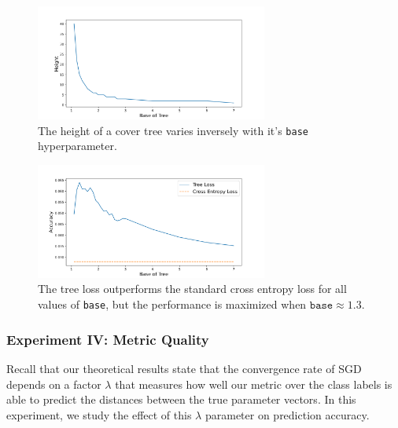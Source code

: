 \documentclass[twoside]{article}
\begin{document}
\begin{figure}
            \includegraphics[width=\columnwidth,height=1.5in]{fig/new_img/height_vs_base.png}
            \caption{The height of a cover tree varies inversely with it's \texttt{base} hyperparameter.}
            \label{fig:ct:height}
\end{figure}

\begin{figure}
    \includegraphics[width=\columnwidth,height=1.5in]{fig/new_img/accuracy_vs_base.png}
            \caption
            {The tree loss outperforms the standard cross entropy loss for all values of \texttt{base}, but the performance is maximized when $\texttt{base}\approx1.3$.}
            \label{fig:ct:acc}
\end{figure}



\subsubsection{Experiment IV: Metric Quality}
\label{sec:synth:eps}

Recall that our theoretical results state that the convergence rate of SGD depends on a factor $\lambda$ that measures how well our metric over the class labels is able to predict the distances between the true parameter vectors.
In this experiment, we study the effect of this $\lambda$ parameter on prediction accuracy.
\end{document}
